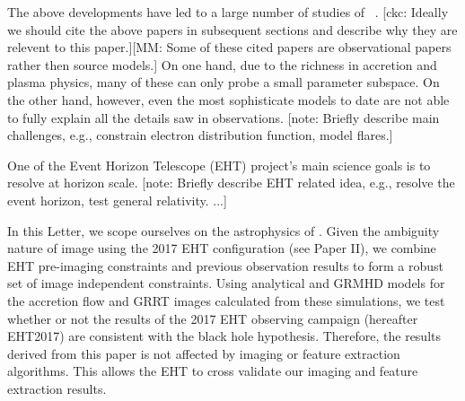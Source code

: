 \documentclass[twocolumn,tighten,dvipsnames,linenumbers]{aastex63}
\newcommand\note[1]{{\color{OliveGreen}[note: #1]}}
\newcommand\ckc[1]{{\color{MidnightBlue}[ckc: #1]}}
\newcommand\monika[1]{{\color{Orange}[MM: #1]}}
\begin{document}

The above developments have led to a large number of studies of
\sgra~\citep[e.g.,][]{2005ApJ...621..785G,2006MNRAS.370..219M, 2007MNRAS.379.1519M,
  2009A&A...508L..13M, 2009ApJ...698..676D, 2009ApJ...701..521C,
  2009ApJ...706..497M, 2012ApJ...746L..10D, 2012MNRAS.421.1315Z,
  2013A&A...559L...3M, 2014A&A...570A...7M, 2014ApJ...790....1B,
  2015A&A...576A..41B, 2015ApJ...799....1C, 2015ApJ...802...69B,
  2015ApJ...812..103C, 2015Sci...350.1242J, 2016A&A...588A..57F,
  2016ApJ...817..173L, 2016ApJ...824...40O, 2016ApJ...826...77B,
  2016ApJ...831....4P, 2016MNRAS.455.2187M, 2017ApJ...837..180G,
  2017ApJ...844...35M, 2017ApJ...851..148M, 2017MNRAS.467.3604R,
  2018A&A...612A..34D, 2018ApJ...856..163M, 2018ApJ...859...60L,
  2018ApJ...863..148P, 2018ApJ...865..104J, 2018ApJ...868..101B,
  2018JCAP...07..015H, 2018MNRAS.478.1875J, 2018MNRAS.478.5209C,
  2019ApJ...881L...2B, 2019ApJ...884..148B, 2019ApJ...886...96H,
  2020ApJ...896L...6R, 2020ApJ...897...99T, 2020MNRAS.492.3272R,
  2020MNRAS.493.1404A, 2020MNRAS.494.4168D, 2020MNRAS.494.5923P,
  2020arXiv200514251B, 2020MNRAS.497.4999D, 2020arXiv200603658P,
  2020ApJ...896L...6R}.
\ckc{Ideally we should cite the above papers in subsequent sections
  and describe why they are relevent to this paper.}\monika{Some of these cited papers are observational papers rather then source models.}
On one hand, due to the richness in accretion and plasma physics, many
of these can only probe a small parameter subspace.
On the other hand, however, even the most sophisticate models to date
are not able to fully explain all the details saw in observations.
\note{Briefly describe main challenges, e.g., constrain electron
  distribution function, model flares.}


One of the Event Horizon Telescope (EHT) project's main science goals
is to resolve \sgra at horizon scale.
\note{Briefly describe EHT related idea, e.g., resolve the event
  horizon, test general relativity.
  ...}

In this Letter, we scope ourselves on the astrophysics of \sgra.
Given the ambiguity nature of \sgra image using the 2017 EHT
configuration (see Paper II), we combine EHT pre-imaging constraints
and previous observation results to form a robust set of image
independent constraints.
Using analytical and GRMHD models for the accretion flow and GRRT
images calculated from these simulations, we test whether or not the
results of the 2017 EHT observing campaign (hereafter EHT2017) are
consistent with the black hole hypothesis.
Therefore, the results derived from this paper is not affected by
imaging or feature extraction algorithms.
This allows the EHT to cross validate our imaging and feature
extraction results.
\end{document}
